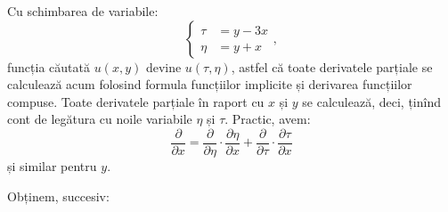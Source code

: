Cu schimbarea de variabile:
\[
    \begin{cases}
        \tau &= y - 3x \\
        \eta &= y + x
    \end{cases},
\]
funcția căutată $ u(x, y) $ devine $ u(\tau, \eta) $, astfel că toate derivatele parțiale
se calculează acum folosind formula funcțiilor implicite și derivarea funcțiilor compuse.
Toate derivatele parțiale în raport cu $ x $ și $ y $ se calculează, deci, ținînd cont de legătura
cu noile variabile $ \eta $ și $ \tau $. Practic, avem:
\[
    \dfrac{\partial}{\partial x} = \dfrac{\partial}{\partial \eta} \cdot \dfrac{\partial \eta}{\partial x} + %
    \dfrac{\partial}{\partial \tau} \cdot \dfrac{\partial \tau}{\partial x}
\]
și similar pentru $ y $.

Obținem, succesiv:

